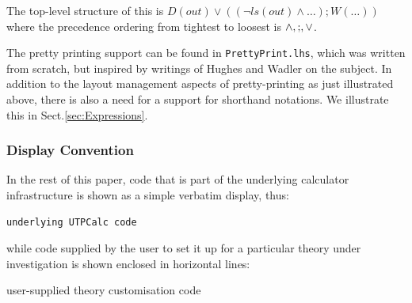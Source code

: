 \noindent
The top-level structure of this is
$D(out) \lor ( (\lnot ls(out) \land \dots) ; W(\dots) )$
where the precedence ordering from tightest to loosest is $\land,\mathrel{;},\lor$.

\noindent
The pretty printing support can be found in \texttt{PrettyPrint.lhs},
which was written from scratch, but inspired by writings of
Hughes\cite{HughesJohn1995c} and Wadler\cite{wadler-pp}
on the subject.
In addition to the layout management aspects of pretty-printing
as just illustrated above,
there is also a need for a support for shorthand notations.
We illustrate this in Sect.\ref{sec:Expressions}.


%

\subsubsection{Display Convention}

In the rest of this paper, code that is part of the underlying
calculator infrastructure is shown as a simple verbatim display, thus:
\begin{verbatim}
underlying UTPCalc code
\end{verbatim}
while code supplied by the user to set it up for a particular
theory under investigation is shown enclosed in horizontal lines:
\begin{code}
user-supplied theory customisation code
\end{code}
